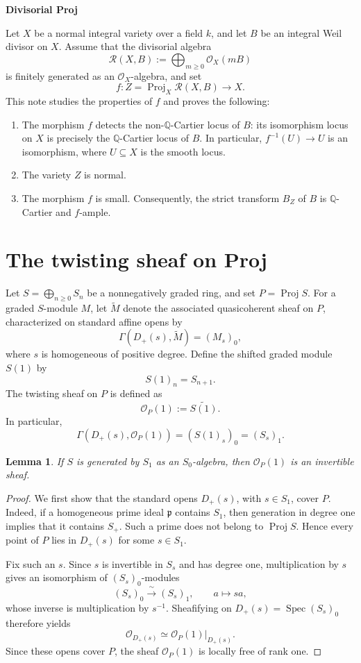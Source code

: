 \documentclass[11pt,a4paper]{article}
\newtheorem{lemma}{Lemma}
\theoremstyle{definition}
\theoremstyle{definition}
\DeclareMathOperator{\Spec}{Spec}
\DeclareMathOperator{\Proj}{Proj}
\newcommand{\OO}{\mathcal O}
\newcommand{\RR}{\mathcal R}
\begin{document}
\begin{center}
 {\Large\bfseries Divisorial Proj}
\end{center}
\vspace{0.5em}

Let $X$ be a normal integral variety over a field $k$, and let $B$ be an integral Weil divisor on $X$. Assume that the divisorial algebra
\[
 \RR(X,B):=\bigoplus_{m\ge0}\OO_X(mB)
\]
is finitely generated as an $\OO_X$-algebra, and set
\[
 f\colon Z=\Proj_X\RR(X,B)\longrightarrow X.
\]
This note studies the properties of $f$ and proves the following:
\begin{enumerate}
 \item The morphism $f$ detects the non-$\mathbb Q$-Cartier locus of $B$: its isomorphism locus on $X$ is precisely the $\mathbb Q$-Cartier locus of $B$. In particular, $f^{-1}(U)\to U$ is an isomorphism, where $U\subseteq X$ is the smooth locus.
 \item The variety $Z$ is normal.
 \item The morphism $f$ is small. Consequently, the strict transform $B_Z$ of $B$ is $\mathbb Q$-Cartier and $f$-ample.
\end{enumerate}

\setcounter{section}{-1}
\section{The twisting sheaf on Proj}

Let $S=\bigoplus_{n\ge0}S_n$ be a nonnegatively graded ring, and set $P=\Proj S$. For a graded $S$-module $M$, let $\widetilde M$ denote the associated quasicoherent sheaf on $P$, characterized on standard affine opens by
\[
 \Gamma(D_+(s),\widetilde M)=(M_s)_0,
\]
where $s$ is homogeneous of positive degree. Define the shifted graded module $S(1)$ by
\[
 S(1)_n=S_{n+1}.
\]
The twisting sheaf on $P$ is defined as
\[
 \OO_P(1):=\widetilde{S(1)}.
\]
In particular,
\[
 \Gamma(D_+(s),\OO_P(1))
 =(S(1)_s)_0=(S_s)_1.
\]

\begin{lemma}\label{lem:degree-one}
If $S$ is generated by $S_1$ as an $S_0$-algebra, then $\OO_P(1)$ is an invertible sheaf.
\end{lemma}

\begin{proof}
We first show that the standard opens $D_+(s)$, with $s\in S_1$, cover $P$. Indeed, if a homogeneous prime ideal $\mathfrak p$ contains $S_1$, then generation in degree one implies that it contains $S_+$. Such a prime does not belong to $\Proj S$. Hence every point of $P$ lies in $D_+(s)$ for some $s\in S_1$.

Fix such an $s$. Since $s$ is invertible in $S_s$ and has degree one, multiplication by $s$ gives an isomorphism of $(S_s)_0$-modules
\[
 (S_s)_0\xrightarrow{\ \sim\ }(S_s)_1,
 \qquad a\longmapsto sa,
\]
whose inverse is multiplication by $s^{-1}$. Sheafifying on $D_+(s)=\Spec(S_s)_0$ therefore yields
\[
 \OO_{D_+(s)}
 \simeq\OO_P(1)|_{D_+(s)}.
\]
Since these opens cover $P$, the sheaf $\OO_P(1)$ is locally free of rank one.
\end{proof}
\end{document}
